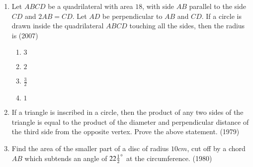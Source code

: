 \begin{enumerate}[label=\thesubsection.\arabic*,ref=\thesubsection.\theenumi]
\begin{multicols}{4}
    \end{multicols}
%
\item Let $ABCD$ be a quadrilateral with area $18$, with side $AB$ parallel to the side $CD$ and $2AB = CD$. Let $AD$ be perpendicular to $AB$ and $CD$. If a circle is drawn inside the quadrilateral $ABCD$ touching all the sides, then the radius is
\hfill (2007)
		\begin{multicols}{4}
\begin{enumerate}
\item $3$
\item $2$
\item $\frac{3}{2}$
\item $1$
\end{enumerate}
\end{multicols}
%
     	\item If a triangle is inscribed in a circle, then the product of any two sides of the triangle is equal to the product of the diameter and perpendicular distance of the third side from the opposite vertex. Prove the above statement.
     \hfill {(1979)}
     	\item Find the area of the smaller part of a disc of radius $10 cm$, cut off by a chord $AB$ which subtends an angle of $22\frac{1}{2} \degree$ at the circumference.
     \hfill {(1980)}
\end{enumerate}
